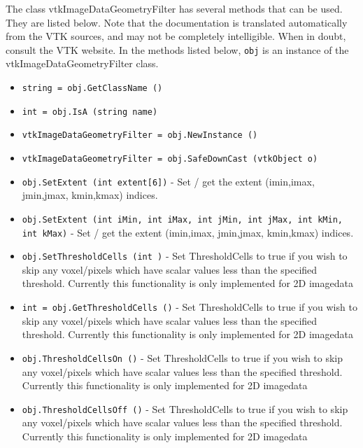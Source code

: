 The class vtkImageDataGeometryFilter has several methods that can be used.
  They are listed below.
Note that the documentation is translated automatically from the VTK sources,
and may not be completely intelligible.  When in doubt, consult the VTK website.
In the methods listed below, \verb|obj| is an instance of the vtkImageDataGeometryFilter class.
\begin{itemize}
\item  \verb|string = obj.GetClassName ()|

\item  \verb|int = obj.IsA (string name)|

\item  \verb|vtkImageDataGeometryFilter = obj.NewInstance ()|

\item  \verb|vtkImageDataGeometryFilter = obj.SafeDownCast (vtkObject o)|

\item  \verb|obj.SetExtent (int extent[6])| -  Set / get the extent (imin,imax, jmin,jmax, kmin,kmax) indices.

\item  \verb|obj.SetExtent (int iMin, int iMax, int jMin, int jMax, int kMin, int kMax)| -  Set / get the extent (imin,imax, jmin,jmax, kmin,kmax) indices.

\item  \verb|obj.SetThresholdCells (int )| -  Set ThresholdCells to true if you wish to skip any voxel/pixels which have scalar
 values less than the specified threshold.
 Currently this functionality is only implemented for 2D imagedata

\item  \verb|int = obj.GetThresholdCells ()| -  Set ThresholdCells to true if you wish to skip any voxel/pixels which have scalar
 values less than the specified threshold.
 Currently this functionality is only implemented for 2D imagedata

\item  \verb|obj.ThresholdCellsOn ()| -  Set ThresholdCells to true if you wish to skip any voxel/pixels which have scalar
 values less than the specified threshold.
 Currently this functionality is only implemented for 2D imagedata

\item  \verb|obj.ThresholdCellsOff ()| -  Set ThresholdCells to true if you wish to skip any voxel/pixels which have scalar
 values less than the specified threshold.
 Currently this functionality is only implemented for 2D imagedata


\end{itemize}
